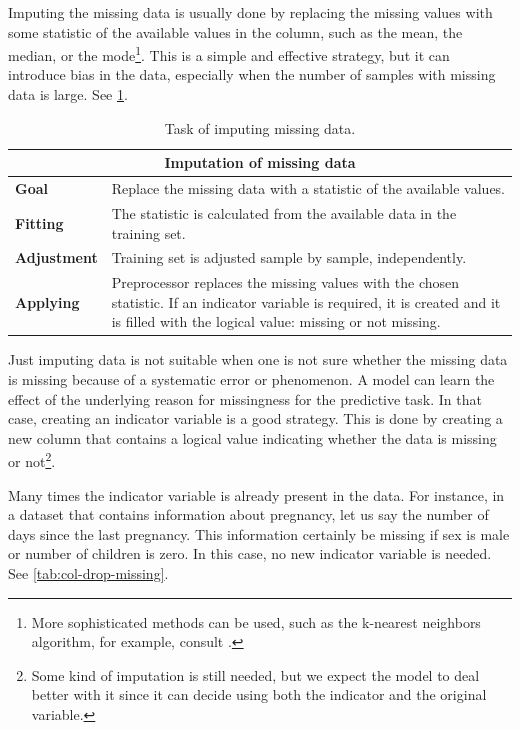Imputing the missing data is usually done by replacing the missing values with some
statistic of the available values in the column, such as the mean, the median, or the
mode\footnote{More sophisticated methods can be used, such as the k-nearest neighbors
algorithm, for example, consult .}.  This is a simple and
effective strategy, but it can introduce bias in the data, especially when the number of
samples with missing data is large.  See \cref{tab:imputation}.

\begin{table}\caption{Task of imputing missing data.}
  \centering
  \begin{tabular}{lp{6cm}}
    \toprule
    \multicolumn{2}{c}{\textbf{Imputation of missing data}} \\
    \midrule
    \textbf{Goal} &
      Replace the missing data with a statistic of the available values. \\
    \textbf{Fitting} &
      The statistic is calculated from the available data in the training set. \\
    \textbf{Adjustment} &
      Training set is adjusted sample by sample, independently. \\
    \textbf{Applying} &
      Preprocessor replaces the missing values with the chosen statistic. If an indicator
      variable is required, it is created and it is filled with the logical value:
      missing or not missing. \\
    \bottomrule
  \end{tabular}
  \label{tab:imputation}
\end{table}

Just imputing data is not suitable when one is not sure whether the missing data is
missing because of a systematic error or phenomenon.  A model can learn the effect of the
underlying reason for missingness for the predictive task.
In that case, creating an indicator variable is a good strategy.  This is done by creating
a new column that contains a logical value indicating whether the data is missing or
not\footnote{Some kind of imputation is still needed, but we expect the model to deal
better with it since it can decide using both the indicator and the original variable.}.

Many times the indicator variable is already present in the data.  For instance, in a
dataset that contains information about pregnancy, let us say the number of days since
the last pregnancy.  This information certainly be missing if sex is male
or number of children is zero.  In this case, no new indicator variable is needed.
See \cref{tab:col-drop-missing}.

